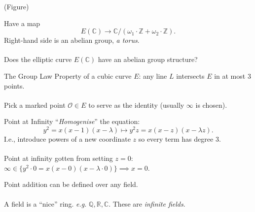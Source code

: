 \documentclass{beamer}
\begin{document}
\begin{frame}	
	(Figure)
\end{frame}

\begin{frame}
	Have a map
	$$
		E(\mathbb{C}) \longrightarrow \mathbb{C}/(\omega_{1}\cdot \mathbb{Z} + \omega_{2}\cdot \mathbb{Z} ).
	$$
	Right-hand side is an abelian group, \emph{a torus}. \\~\\
	
	Does the elliptic curve $E(\mathbb{C})$ have an abelian group structure?
\end{frame}

\begin{frame}[t]{The Group Law}
	Property of a cubic curve $E$: any line $L$ intersects $E$ in at most 3 points. \\~\\ 	
	
	Pick a marked point $\mathcal{O} \in E$ to serve as the identity (usually $\infty$ is chosen).
\end{frame}

\begin{frame}[t]{Point at Infinity}
	``\emph{Homogenise}'' the equation:
	$$
		y^{2} = x(x-1)(x-\lambda) \longmapsto y^{2}z = x(x-z)(x-\lambda z).
	$$
	I.e., introduce powers of a new coordinate $z$ so every term has degree 3. \\~\\
	
	Point at infinity gotten from setting $z = 0$: $\infty \in \big\{ y^{2}\cdot 0 = x(x-0)(x-\lambda\cdot 0) \big\} \implies x = 0$.
\end{frame}

\begin{frame}
	Point addition can be defined over any field. \\~\\
	
	A field is a ``nice'' ring. \emph{e.g.} $\mathbb{Q}, \mathbb{R}, \mathbb{C}$. These are \emph{infinite fields}. \\~\\

\end{frame}

\begin{frame}
\end{frame}

\begin{frame}
\end{frame}
\end{document}
